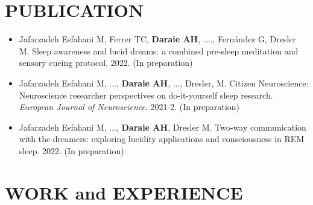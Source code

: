 \documentclass[10pt,a4paper,sans]{moderncv} %
\begin{document}
	\section{PUBLICATION}

    \begin{itemize}
    \item Jafarzadeh Esfahani M, Ferrer TC, \textbf{Daraie AH}, ...., Fernández G, Dresler M. Sleep awareness and lucid dreams: a combined pre-sleep meditation and sensory cueing protocol. 2022. (In preparation)

    \item Jafarzadeh Esfahani M, ..., \textbf{Daraie AH}, ..., Dresler, M. Citizen Neuroscience: Neuroscience researcher perspectives on do-it-yourself sleep research. \textit{European Journal of Neuroscience}. 2021-2. (In preparation)

    \item Jafarzadeh Esfahani M, ..., \textbf{Daraie AH}, Dresler M. Two-way communication with the dreamers: exploring lucidity applications and consciousness in REM sleep. 2022. (In preparation)
    \end{itemize}

    \newpage

	\section{WORK and EXPERIENCE}
    \vspace{0.3em}
\end{document}
